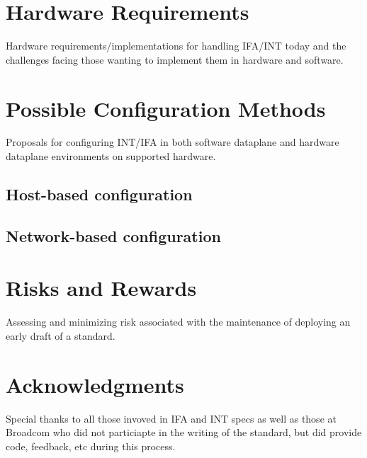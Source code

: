 \documentclass[letterpaper,twocolumn,10pt]{article}
\begin{document}
\section{Hardware Requirements}

Hardware requirements/implementations for handling IFA/INT today and the challenges facing those
wanting to implement them in hardware and software.

\section{Possible Configuration Methods}

Proposals for configuring INT/IFA in both software dataplane and
hardware dataplane environments on supported hardware.

\subsection{Host-based configuration}

\subsection{Network-based configuration}

\section{Risks and Rewards}

Assessing and minimizing risk associated with the maintenance of
deploying an early draft of a standard.

\section{Acknowledgments}

Special thanks to all those invoved in IFA and INT specs as well as
those at Broadcom who did not particiapte in the writing of the
standard, but did provide code, feedback, etc during this process.

{\normalsize 
}


\theendnotes
\end{document}
